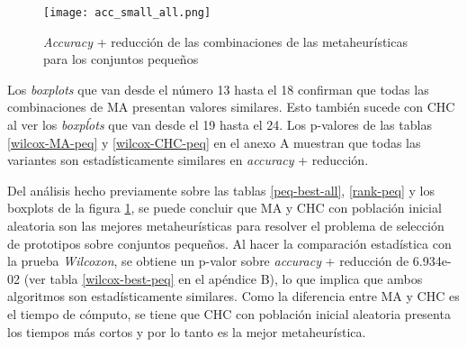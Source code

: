 \begin{figure}[h!]

	\centering
	\texttt{[image: acc\_small\_all.png]}

\caption{\emph{Accuracy} + reducción de las combinaciones de las metaheurísticas para los conjuntos pequeños}
\label{small-accu-all}
\end{figure}


%
%

Los \emph{boxplots} que van desde el número 13 hasta el 18 confirman que todas las combinaciones de MA presentan valores similares. Esto también sucede con CHC al ver los \emph{boxpĺots} que van desde el 19 hasta el 24. Los p-valores de las tablas \ref{wilcox-MA-peq} y \ref{wilcox-CHC-peq} en el anexo A muestran que todas las variantes son estadísticamente similares en \emph{accuracy} + reducción.

Del análisis hecho previamente sobre las tablas \ref{peq-best-all}, \ref{rank-peq} y los boxplots de la figura \ref{small-accu-all}, se puede concluir que MA y CHC con población inicial aleatoria son las mejores metaheurísticas para resolver el problema de selección de prototipos sobre conjuntos pequeños. Al hacer la comparación estadística con la prueba \emph{Wilcoxon}, se obtiene un p-valor sobre \emph{accuracy} + reducción de 6.934e-02 (ver tabla \ref{wilcox-best-peq} en el apéndice B), lo que implica que ambos algoritmos son estadísticamente similares. Como la diferencia entre MA y CHC es el tiempo de cómputo, se tiene que CHC con población inicial aleatoria presenta los tiempos más cortos y por lo tanto es la mejor metaheurística.







